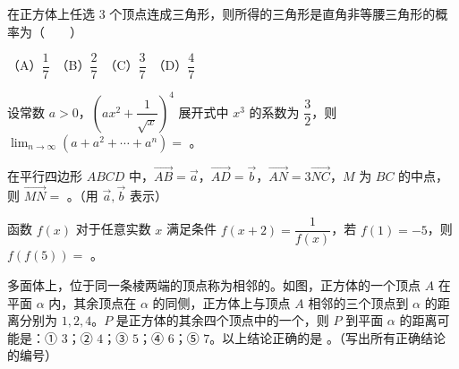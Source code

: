 \begin{question}
在正方体上任选 3 个顶点连成三角形，则所得的三角形是直角非等腰三角形的概率为\mbox{（　　）}

（A）$\dfrac17$　（B）$\dfrac27$　（C）$\dfrac37$　（D）$\dfrac47$

\end{question}

\begin{question}
设常数 $a>0$，$(ax^2+\dfrac{1}{\sqrt{x}})^4$ 展开式中 $x^3$ 的系数为 $\dfrac32$，则 $\displaystyle\lim_{n\to\infty}(a+a^2+\cdots+a^n)=$ \gkblank{}。

\end{question}
\begin{question}
在平行四边形 $ABCD$ 中，$\overrightarrow{AB}=\vec a$，$\overrightarrow{AD}=\vec b$，$\overrightarrow{AN}=3\overrightarrow{NC}$，$M$ 为 $BC$ 的中点，则 $\overrightarrow{MN}=$ \gkblank{}。（用 $\vec a,\vec b$ 表示）

\end{question}
\begin{question}
函数 $f(x)$ 对于任意实数 $x$ 满足条件 $f(x+2)=\dfrac{1}{f(x)}$，若 $f(1)=-5$，则 $f(f(5))=$ \gkblank{}。

\Needspace{0.4\textheight}
\end{question}
\begin{question}
多面体上，位于同一条棱两端的顶点称为相邻的。如图，正方体的一个顶点 $A$ 在平面 $\alpha$ 内，其余顶点在 $\alpha$ 的同侧，正方体上与顶点 $A$ 相邻的三个顶点到 $\alpha$ 的距离分别为 $1,2,4$。$P$ 是正方体的其余四个顶点中的一个，则 $P$ 到平面 $\alpha$ 的距离可能是：① $3$；② $4$；③ $5$；④ $6$；⑤ $7$。以上结论正确的是 \gkblank{}。（写出所有正确结论的编号）
\nopagebreak[4]
\begin{center}\end{center}
\nopagebreak[4]
\end{question}

